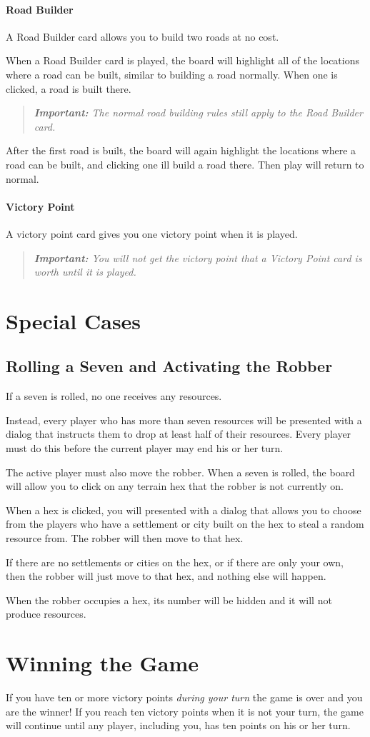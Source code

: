 \documentclass[12pt,letterpaper,titlepage]{article}
\newcommand\note[1]{\begin{quote}\emph{\textbf{Important:} #1}\end{quote}}
\begin{document}
			\paragraph{Road Builder}
			A Road Builder card allows you to build two roads at no cost.
			
			When a Road Builder card is played, the board will highlight all of the locations where a road can be built, similar to building a road normally. When one is clicked, a road is built there. 
			
			\note{The normal road building rules still apply to the Road Builder card.}
			
			After the first road is built, the board will again highlight the locations where a road can be built, and clicking one ill build a road there. Then play will return to normal.
			
			\paragraph{Victory Point}
			A victory point card gives you one victory point when it is played.
			
			\note{You will not get the victory point that a Victory Point card is worth until it is played.}

\section{Special Cases}
	\subsection{Rolling a Seven and Activating the Robber}
	If a seven is rolled, no one receives any resources.
		
	Instead, every player who has more than seven resources will be presented with a dialog that instructs them to drop at least half of their resources. Every player must do this before the current player may end his or her turn.
		
	The active player must also move the robber. When a seven is rolled, the board will allow you to click on any terrain hex that the robber is not currently on.
	
	When a hex is clicked, you will presented with a dialog that allows you to choose from the players who have a settlement or city built on the hex to steal a random resource from. The robber will then move to that hex.
	
	If there are no settlements or cities on the hex, or if there are only your own, then the robber will just move to that hex, and nothing else will happen.
	
	When the robber occupies a hex, its number will be hidden and it will not produce resources.

\section{Winning the Game}
If you have ten or more victory points \emph{during your turn} the game is over and you are the winner! If you reach ten victory points when it is not your turn, the game will continue until any player, including you, has ten points on his or her turn.
\end{document}
